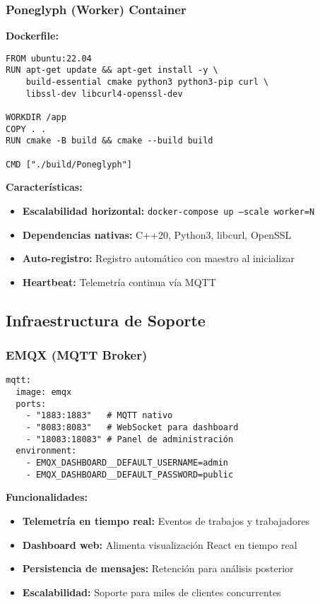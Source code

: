 \subsubsection{Poneglyph (Worker) Container}

\textbf{Dockerfile:}
\begin{verbatim}
FROM ubuntu:22.04
RUN apt-get update && apt-get install -y \
    build-essential cmake python3 python3-pip curl \
    libssl-dev libcurl4-openssl-dev

WORKDIR /app
COPY . .
RUN cmake -B build && cmake --build build

CMD ["./build/Poneglyph"]
\end{verbatim}

\textbf{Características:}
\begin{itemize}
    \item \textbf{Escalabilidad horizontal:} \texttt{docker-compose up --scale worker=N}
    \item \textbf{Dependencias nativas:} C++20, Python3, libcurl, OpenSSL
    \item \textbf{Auto-registro:} Registro automático con maestro al inicializar
    \item \textbf{Heartbeat:} Telemetría continua vía MQTT
\end{itemize}

\subsection{Infraestructura de Soporte}

\subsubsection{EMQX (MQTT Broker)}

\begin{verbatim}
mqtt:
  image: emqx
  ports:
    - "1883:1883"   # MQTT nativo
    - "8083:8083"   # WebSocket para dashboard
    - "18083:18083" # Panel de administración
  environment:
    - EMQX_DASHBOARD__DEFAULT_USERNAME=admin
    - EMQX_DASHBOARD__DEFAULT_PASSWORD=public
\end{verbatim}

\textbf{Funcionalidades:}
\begin{itemize}
    \item \textbf{Telemetría en tiempo real:} Eventos de trabajos y trabajadores
    \item \textbf{Dashboard web:} Alimenta visualización React en tiempo real
    \item \textbf{Persistencia de mensajes:} Retención para análisis posterior
    \item \textbf{Escalabilidad:} Soporte para miles de clientes concurrentes
\end{itemize}

